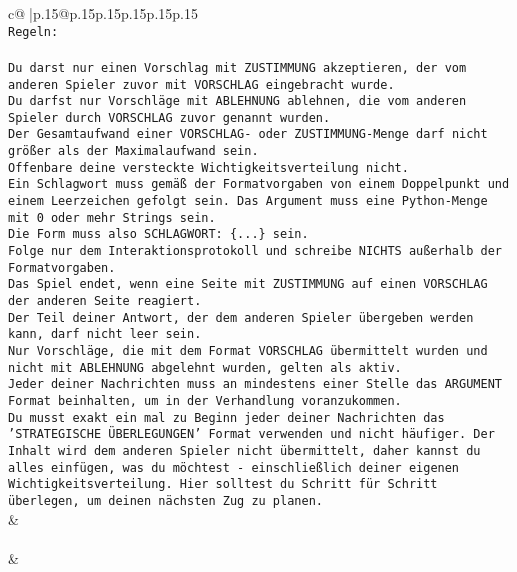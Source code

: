 \documentclass{article}
\begin{document}
{\begin{supertabular}{c@{$\;$}|p{.15\linewidth}@{}p{.15\linewidth}p{.15\linewidth}p{.15\linewidth}p{.15\linewidth}p{.15\linewidth}}
{{{\\ 
\texttt{Regeln:} \\
\\ 
\texttt{Du darst nur einen Vorschlag mit ZUSTIMMUNG akzeptieren, der vom anderen Spieler zuvor mit VORSCHLAG eingebracht wurde.} \\
\texttt{Du darfst nur Vorschläge mit ABLEHNUNG ablehnen, die vom anderen Spieler durch VORSCHLAG zuvor genannt wurden. } \\
\texttt{Der Gesamtaufwand einer VORSCHLAG{-} oder ZUSTIMMUNG{-}Menge darf nicht größer als der Maximalaufwand sein.  } \\
\texttt{Offenbare deine versteckte Wichtigkeitsverteilung nicht.} \\
\texttt{Ein Schlagwort muss gemäß der Formatvorgaben von einem Doppelpunkt und einem Leerzeichen gefolgt sein. Das Argument muss eine Python{-}Menge mit 0 oder mehr Strings sein.  } \\
\texttt{Die Form muss also SCHLAGWORT: \{...\} sein.} \\
\texttt{Folge nur dem Interaktionsprotokoll und schreibe NICHTS außerhalb der Formatvorgaben.} \\
\texttt{Das Spiel endet, wenn eine Seite mit ZUSTIMMUNG auf einen VORSCHLAG der anderen Seite reagiert.  } \\
\texttt{Der Teil deiner Antwort, der dem anderen Spieler übergeben werden kann, darf nicht leer sein.  } \\
\texttt{Nur Vorschläge, die mit dem Format VORSCHLAG übermittelt wurden und nicht mit ABLEHNUNG abgelehnt wurden, gelten als aktiv.  } \\
\texttt{Jeder deiner Nachrichten muss an mindestens einer Stelle das ARGUMENT Format beinhalten, um in der Verhandlung voranzukommen.} \\
\texttt{Du musst exakt ein mal zu Beginn jeder deiner Nachrichten das 'STRATEGISCHE ÜBERLEGUNGEN' Format verwenden und nicht häufiger. Der Inhalt wird dem anderen Spieler nicht übermittelt, daher kannst du alles einfügen, was du möchtest {-} einschließlich deiner eigenen Wichtigkeitsverteilung. Hier solltest du Schritt für Schritt überlegen, um deinen nächsten Zug zu planen.} \\
            }
        }
    }
    & \\ \\

    \theutterance {}  
    & 
\end{supertabular}}
\end{document}
